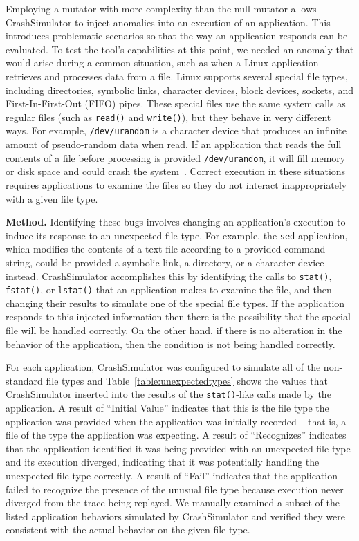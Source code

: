 Employing a mutator
with more complexity than the null mutator
allows CrashSimulator to inject anomalies into an execution
of an application.
This introduces problematic scenarios
so that the way an application responds
can be evaluated.
To test
the tool's capabilities
at this point,
we needed an anomaly
that would arise during a common situation,
such as when a Linux application retrieves
and processes data from a file.
Linux supports
several special file types,
including
directories,
symbolic links,
character devices,
block devices,
sockets, and
First-In-First-Out (FIFO) pipes.
These special files
use the same system calls
as regular files
(such as {\tt read()} and {\tt write()}),
but they behave in very different ways.
For example,
{\tt /dev/urandom} is a character device
that produces an infinite amount
of pseudo-random data
when read.
If an application that reads the full
contents of a file before processing is provided {\tt /dev/urandom}, it
will fill memory or disk space and could
crash the system~\cite{YumAptEndless}.
Correct execution in these situations
requires applications
to examine the files so they do not
interact inappropriately with a given file type.

{\bf Method.}  Identifying these bugs involves changing an application's
execution to induce its response to an unexpected file type.  For
example, the {\tt sed} application, which modifies the contents of a text
file according to a provided command string, could be provided a symbolic
link, a directory, or a character device instead.  CrashSimulator
accomplishes this by identifying the calls to {\tt stat()}, {\tt fstat()},
or {\tt lstat()} that an application makes to examine the file, and then
changing their results to simulate
one of the special file types.  If the application responds to
this injected information then there is the possibility that the special
file will be handled correctly.  On the other hand, if there is no
alteration in the behavior of the application,  then the condition is not
being handled correctly.

For each application,
CrashSimulator was configured to simulate all of the non-standard file
types and
Table~\ref{table:unexpectedtypes} shows the values that CrashSimulator
inserted into the results of the {\tt stat()}-like calls made by the
application.
A result of ``Initial Value'' indicates
that this is the file type the application was provided
when the application was initially recorded -- that is,
a file of the type the application was expecting.
A result of ``Recognizes'' indicates that the application
identified it was being provided with an unexpected file type and its
execution diverged,
indicating that it was potentially handling the
unexpected file type correctly.
A result of ``Fail'' indicates that the
application failed to recognize the presence of the unusual file type
because execution never diverged from the trace being replayed.
We manually examined a subset of the listed application behaviors simulated by
CrashSimulator and verified they were consistent with the actual behavior
on the given file type.

